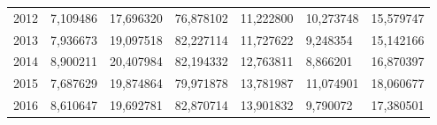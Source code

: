 \begin{table}
\begin{tabular}{p{1cm}p{2cm}p{2cm}p{2cm}p{2cm}p{2cm}p{2cm}}
 2012 &         7,109486 &            17,696320 &          76,878102 &            11,222800 & 10,273748 &                           15,579747 \\
 2013 &         7,936673 &            19,097518 &          82,227114 &            11,727622 &  9,248354 &                           15,142166 \\
 2014 &         8,900211 &            20,407984 &          82,194332 &            12,763811 &  8,866201 &                           16,870397 \\
 2015 &         7,687629 &            19,874864 &          79,971878 &            13,781987 & 11,074901 &                           18,060677 \\
 2016 &         8,610647 &            19,692781 &          82,870714 &            13,901832 &  9,790072 &                           17,380501 \\
\bottomrule
\end{tabular}
\end{table}
